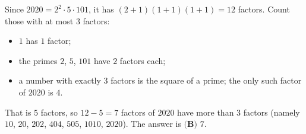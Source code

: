 Since $2020=2^2\cdot5\cdot101$, it has $(2+1)(1+1)(1+1)=12$ factors. Count those with at most $3$ factors:
\begin{itemize}
\item $1$ has $1$ factor;
\item the primes $2$, $5$, $101$ have $2$ factors each;
\item a number with exactly $3$ factors is the square of a prime; the only such factor of $2020$ is $4$.
\end{itemize}
That is $5$ factors, so $12-5=7$ factors of $2020$ have more than $3$ factors (namely $10$, $20$, $202$, $404$, $505$, $1010$, $2020$). The answer is $\boxed{\textbf{(B) }7}$.
